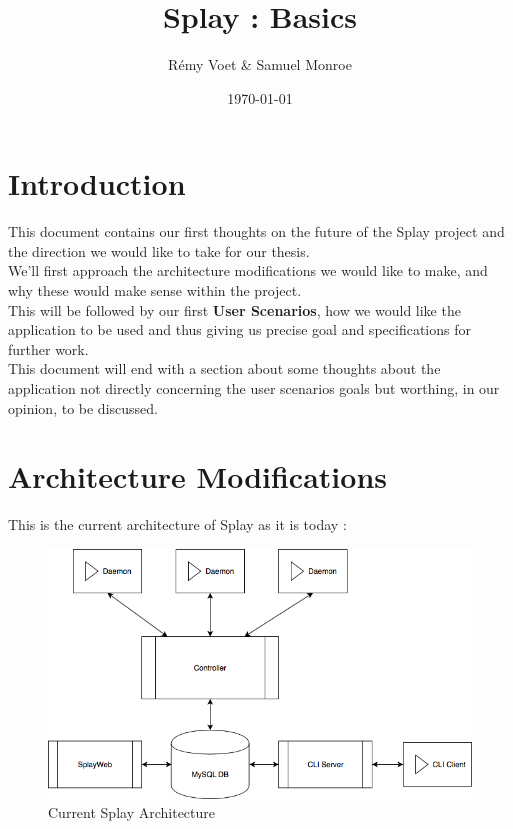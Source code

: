 \documentclass{article}
\title{Splay : Basics}
\author{Rémy Voet \& Samuel Monroe}
\date{\today}
\begin{document}
\maketitle

\section{Introduction}

  This document contains our first thoughts on the future of the Splay project
  and the direction we would like to take for our thesis.\\

  We'll first approach the architecture modifications we would like to
  make, and why these would make sense within the project.\\
  This will be followed by our first \textbf{User Scenarios}, how we
  would like the application to be used and thus giving us precise goal and
  specifications for further work.\\

  This document will end with a section about some thoughts about the
  application not directly concerning the user scenarios goals but
  worthing, in our opinion, to be discussed.

\section{Architecture Modifications}

  This is the current architecture of Splay as it is today : \\

  \begin{figure}[H]
   \caption{\label{curr_arch} Current Splay Architecture}
   \centering
   \includegraphics[scale=0.6]{images/curr_arch.png}
  \end{figure}
\end{document}
